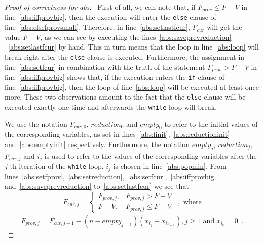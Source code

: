\begin{proof}[Proof of correctness for abs] \
  First of all, we can note that, if $F_{prov} \leq F - V$ in line~\ref{abs:iffprovbig}, then the execution will enter the
  \texttt{else} clause of line~\ref{abs:elsefprovsmall}. Therefore, in line~\ref{abs:setlastfcur}, $F_{cur}$ will get the
  value $F - V$, as we can see by executing the lines~\ref{abs:saveprevreduction} -~\ref{abs:setlastfcur} by hand. This in
  turn means that the loop in line~\ref{abs:loop} will break right after the \texttt{else} clause is executed. Furthermore,
  the assignment in line~\ref{abs:setfcur} in combination with the truth of the statement $F_{prov} > F - V$ in
  line~\ref{abs:iffprovbig} shows that, if the execution enters the \texttt{if} clause of line~\ref{abs:iffprovbig}, then
  the loop of line~\ref{abs:loop} will be executed at least once more. These two observations amount to the fact that the
  \texttt{else} clause will be executed exactly one time and afterwards the \texttt{while} loop will break.

  We use the notation $F_{cur, 0}$, $reduction_0$ and $empty_0$ to refer to the initial values of the corresponding
  variables, as set in lines~\ref{abs:finit},~\ref{abs:reductioninit} and~\ref{abs:emptyinit} respectively. Furthermore, the
  notation $empty_j$, $reduction_j$, $F_{cur, j}$ and $i_j$ is used to refer to the values of the corresponding variables
  after the $j$-th iteration of the \texttt{while} loop. $i_j$ is chosen in line~\ref{abs:popmin}. From
  lines~\ref{abs:setfprov},~\ref{abs:setreduction},~\ref{abs:setfcur},~\ref{abs:iffprovbig} and~\ref{abs:saveprevreduction}
  to~\ref{abs:setlastfcur} we see that
  \begin{equation*}
    F_{cur, j} =
    \begin{cases}
       F_{prov, j},& F_{prov, j} > F - V \\
       F - V ,& F_{prov, j} \leq F - V
    \end{cases} \enspace, \mbox{ where}
  \end{equation*}
  \begin{equation*}
  \begin{gathered}
    F_{prov, j} = F_{cur, j-1} - \left(n - empty_{j-1}\right)\left(x_{i_j} - x_{i_{j-1}}\right), j \geq 1 \mbox{ and }
    x_{i_0} = 0 \enspace.
  \end{gathered}
  \end{equation*}


\end{proof}
